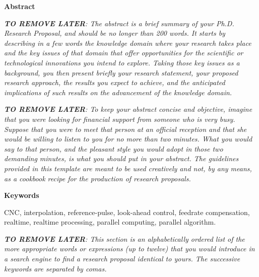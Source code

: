 \justifying
\vspace*{4\baselineskip}
{\LARGE\bfseries 
	Abstract\\
} 

\vspace*{1\baselineskip}

\begin{tcolorbox}	
\textit{\textbf{TO REMOVE LATER}: The abstract is a brief summary of your Ph.D. Research Proposal, and should be no longer than 200 words. It starts by describing in a few words the knowledge domain where your research takes place and the key issues of that domain that offer opportunities for the scientific or technological innovations you intend to explore. Taking those key issues as a background, you then present briefly your research statement, your proposed research approach, the results you expect to achieve, and the anticipated implications of such results on the advancement of the knowledge domain.}
\vspace*{1\baselineskip}

\textit{\textbf{TO REMOVE LATER}: To keep your abstract concise and objective, imagine that you were looking for financial support from someone who is very busy. Suppose that you were to meet that person at an official reception and that she would be willing to listen to you for no more than two minutes. What you would say to that person, and the pleasant style you would adopt in those two demanding minutes, is what you should put in your abstract. The guidelines provided in this template are meant to be used creatively and not, by any means, as a cookbook recipe for the production of research proposals.}
\end{tcolorbox}

\vspace*{1\baselineskip}
\normalsize
\textbf{Keywords}
\vspace*{1\baselineskip}

CNC, interpolation, reference-pulse, look-ahead control, feedrate compensation, realtime, realtime processing, parallel computing, parallel algorithm. 
\vspace*{1\baselineskip}

\begin{tcolorbox}
\textit{\textbf{TO REMOVE LATER}: This section is an alphabetically ordered list of the more appropriate words or expressions (up to twelve) that you would introduce in a search engine to find a research proposal identical to yours. The successive keywords are separated by comas.}
\end{tcolorbox}

